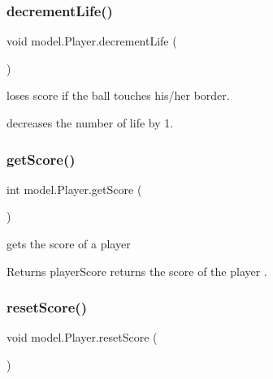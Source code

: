 \subsubsection{\texorpdfstring{decrement\+Life()}{decrementLife()}}
{\footnotesize\ttfamily void model.\+Player.\+decrement\+Life (\begin{DoxyParamCaption}{ }\end{DoxyParamCaption})}



loses score if the ball touches his/her border. 

decreases the number of life by 1. \hypertarget{classmodel_1_1_player_a9e027a7ee08d451cde3e6743e2ef1d6d}{}\label{classmodel_1_1_player_a9e027a7ee08d451cde3e6743e2ef1d6d} 
\subsubsection{\texorpdfstring{get\+Score()}{getScore()}}
{\footnotesize\ttfamily int model.\+Player.\+get\+Score (\begin{DoxyParamCaption}{ }\end{DoxyParamCaption})}



gets the score of a player 

\begin{DoxyReturn}{Returns}
player\+Score returns the score of the player . 
\end{DoxyReturn}
\hypertarget{classmodel_1_1_player_a1ce780b4bc3a1564934975b18e68df8c}{}\label{classmodel_1_1_player_a1ce780b4bc3a1564934975b18e68df8c} 
\subsubsection{\texorpdfstring{reset\+Score()}{resetScore()}}
{\footnotesize\ttfamily void model.\+Player.\+reset\+Score (\begin{DoxyParamCaption}{ }\end{DoxyParamCaption})}

\hypertarget{classmodel_1_1_player_acb5f4cdd639aa3e68a5003ec81bdd47c}{}\label{classmodel_1_1_player_acb5f4cdd639aa3e68a5003ec81bdd47c} 
